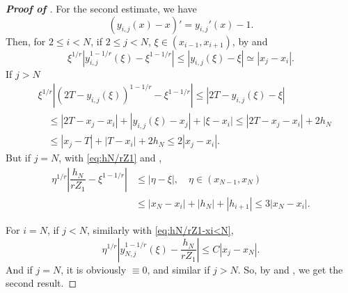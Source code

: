\documentclass{amsart}
\theoremstyle{definition}
\theoremstyle{remark}
\numberwithin{equation}{section}
\begin{document}
\begin{proof} [\bf Proof of ]
  For the second estimate, we have
  \begin{equation*}
      (y_{i,j}(x) - x)' = y_{i,j}'(x) - 1.
  \end{equation*}
  Then, for \(2\le i < N\), if \(2\le j<N\), \(\xi \in (x_{i-1}, x_{i+1})\), by  and 
  \begin{equation*}
    \xi^{1/r} |y_{i,j}^{1-1/r}(\xi) - \xi^{1-1/r}| \le |y_{i,j}(\xi) - \xi| \simeq |x_{j}-x_{i}|  .
  \end{equation*}
  If \(j>N\)
  \begin{equation*} \label{eq:2T-yij1-1/r}
    \begin{aligned}
      &\xi^{1/r} |(2T-y_{i,j}(\xi))^{1-1/r} - \xi^{1-1/r}|
              \le |2T - y_{i,j}(\xi) - \xi|  \\
      & \quad \le |2T - x_j - x_i| + |y_{i,j}(\xi) - x_j| + |\xi - x_i|
              \le |2T - x_j - x_i| + 2 h_N   \\
      & \quad \le |x_j - T| + |T-x_i| + 2h_N \le 2 |x_j - x_i|.
    \end{aligned}
  \end{equation*}
  But if \(j=N\), with \eqref{eq:hN/rZ1} and ,
  \begin{equation} \label{eq:hN/rZ1-xi<N}
    \begin{aligned}
      \eta^{1/r} |\dfrac{h_N}{r Z_1} - \xi^{1-1/r}| &\le |\eta - \xi|, \quad \eta \in (x_{N-1}, x_{N})  \\
      & \le |x_N - x_i| + |h_N| + |h_{i+1}| \le 3 |x_N - x_i|.
    \end{aligned}
  \end{equation}

  For \(i=N\), if \(j<N\), similarly with \eqref{eq:hN/rZ1-xi<N},
  \begin{equation*}
    \eta^{1/r} |y_{N, j}^{1-1/r}(\xi) - \dfrac{h_N}{r Z_1}| \le C |x_j - x_N|.
  \end{equation*}
  And if \(j=N\), it is obviously \(\equiv 0\), and similar if \(j>N\).
  So, by  and , we get the second result.
\end{proof}
\end{document}
